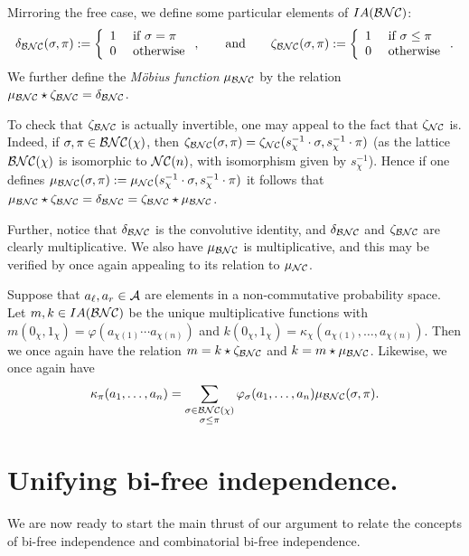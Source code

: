 \begin{definition}
	Mirroring the free case, we define some particular elements of $IA(\mathcal{BNC})$:
	\[
		\delta_{\mathcal{BNC}}(\sigma, \pi) := \left\{\begin{array}{ll}1 & \text{ if } \sigma = \pi \\ 0 & \text{ otherwise}\end{array}\right.,
			\qquad\text{and}\qquad
		\zeta_{\mathcal{BNC}}(\sigma, \pi) := \left\{\begin{array}{ll}1 & \text{ if } \sigma \leq \pi \\ 0 & \text{ otherwise}\end{array}\right..
			\]
	We further define the \emph{M\"obius function} $\mu_{\mathcal{BNC}}$ by the relation $\mu_{\mathcal{BNC}} \star \zeta_{\mathcal{BNC}} = \delta_{\mathcal{BNC}}$.
\end{definition}

To check that $\zeta_{\mathcal{BNC}}$ is actually invertible, one may appeal to the fact that $\zeta_{\mathcal{NC}}$ is.
Indeed, if $\sigma, \pi \in \mathcal{BNC}(\chi)$, then $\zeta_{\mathcal{BNC}}(\sigma, \pi) = \zeta_{\mathcal{NC}}(s_\chi^{-1}\cdot\sigma, s_\chi^{-1}\cdot\pi)$ (as the lattice $\mathcal{BNC}(\chi)$ is isomorphic to $\mathcal{NC}(n)$, with isomorphism given by $s_\chi^{-1}$).
Hence if one defines $\mu_{\mathcal{BNC}}(\sigma, \pi) := \mu_{\mathcal{NC}}(s_\chi^{-1}\cdot\sigma, s_\chi^{-1}\cdot\pi)$ it follows that $\mu_{\mathcal{BNC}}\star\zeta_{\mathcal{BNC}} = \delta_{\mathcal{BNC}} = \zeta_{\mathcal{BNC}}\star\mu_{\mathcal{BNC}}$.

Further, notice that $\delta_{\mathcal{BNC}}$ is the convolutive identity, and $\delta_{\mathcal{BNC}}$ and $\zeta_{\mathcal{BNC}}$ are clearly multiplicative.
We also have $\mu_{\mathcal{BNC}}$ is multiplicative, and this may be verified by once again appealing to its relation to $\mu_{\mathcal{NC}}$.

\begin{remark}
	\label{rem:cumulantformula}
	Suppose that $a_\ell, a_r \in \mathcal{A}$ are elements in a non-commutative probability space.
	Let $m, k \in IA(\mathcal{BNC})$ be the unique multiplicative functions with $m(0_\chi, 1_\chi) = \varphi(a_{\chi(1)}\cdots a_{\chi(n)})$ and $k(0_\chi, 1_\chi) = \kappa_\chi(a_{\chi(1)}, \ldots, a_{\chi(n)})$.
	Then we once again have the relation $m = k\star\zeta_{\mathcal{BNC}}$ and $k = m\star\mu_{\mathcal{BNC}}$.
	Likewise, we once again have
	$$
		\kappa_\pi(a_1, \ldots, a_n) = \sum_{\substack{\sigma \in \mathcal{BNC}(\chi) \\ \sigma \leq \pi}} \varphi_\sigma(a_1, \ldots, a_n) \mu_{\mathcal{BNC}}(\sigma, \pi).
	$$
\end{remark}


\section{Unifying bi-free independence.}
\label{sec:unibifree}
We are now ready to start the main thrust of our argument to relate the concepts of bi-free independence and combinatorial bi-free independence.

